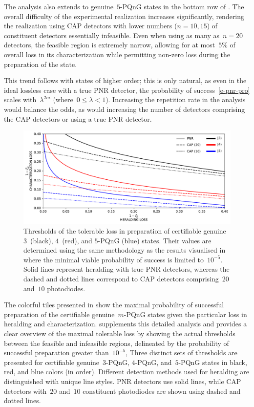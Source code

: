 \documentclass{article}
\begin{document}
The analysis also extends to genuine~$5$-PQnG states in the {bottom} row of . The overall difficulty of the experimental realization increases significantly, rendering the realization using CAP detectors with lower numbers (${n = 10, 15}$) of constituent detectors essentially infeasible. Even when using as many as~${n = 20}$ detectors, the feasible region is extremely narrow, allowing for at most~$5\%$ of overall loss in its characterization while permitting non-zero loss during the preparation of the state.

This trend follows with states of higher order; this is only natural, as even in the ideal lossless case with a true PNR detector, the probability of success~\eqref{e-pnr-pro} scales with~${\lambda^{2m}}$ (where~${0 \leq \lambda < 1}$). Increasing the repetition rate in the analysis would balance the odds, as would increasing the number of detectors comprising the CAP detectors or using a true PNR detector.

\begin{figure}[h]
  \begin{center}
    \includegraphics[width = \columnwidth]{import/202504/curves_unified_03_04_05.pdf}
  \end{center}
  \caption{
    Thresholds of the tolerable loss in preparation of certifiable genuine $3$~(black), $4$~(red), and $5$-PQnG (blue) states. Their values are determined using the same methodology as the results visualised in  where the minimal viable probability of success is limited to~$10^{-5}$. Solid lines represent heralding with true PNR detectors, whereas the dashed and dotted lines correspond to CAP detectors comprising~$20$ and~$10$ photodiodes.
  }
  \label{f-thr-345}
\end{figure}

The colorful tiles presented in  show the maximal probability of successful preparation of the certifiable genuine~$m$-PQnG states given the particular loss in heralding and characterization.  supplements this detailed analysis and provides a clear overview of the maximal tolerable loss by showing the actual thresholds between the feasible and infeasible regions, delineated by the probability of successful preparation greater than~$10^{-5}$, 
%
Three distinct sets of thresholds are presented for certifiable genuine~$3$-PQnG, $4$-PQnG, and~$5$-PQnG states in black, red, and blue colors (in order). Different detection methods used for heralding are distinguished with unique line styles. PNR detectors use solid lines, while CAP detectors with~$20$ and~$10$ constituent photodiodes are shown using dashed and dotted lines.
\end{document}
